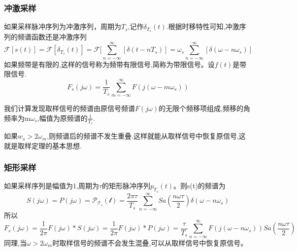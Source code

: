 \subsubsection{冲激采样}
\qquad 如果采样脉冲序列为冲激序列，周期为$T_s$,记作$\delta_{T_s}(t)$.根据时移特性可知,冲激序列的频谱函数还是冲激序列
\[
\mathcal{F}[{s(t)}]=\mathcal{F}[{\delta_{T_s}(t)}]=\mathcal{F}[\sum_{n=-\infty}^{\infty}[\delta(t-nT_s)]=\omega_s\sum_{n=-\infty}^{\infty}[\delta(\omega-n\omega_s)]
\]
\qquad 如果频带是有限的,这样的信号称为频带有限信号,简称为带限信号。设$f(t)$是带限信号.
\[
F_s(j\omega)=\frac{1}{T_s}\sum_{m=-\infty}^{\infty}F(j(\omega-m\omega_s))
\]
\par
我们计算发现取样信号的频谱由原信号频谱$F(j\omega)$的无限个频移项组成,频移的角频率为m$\omega_s$,幅值为原频谱的$\frac{1}{T_s}$.\par
 如果$w_s>2\omega_m$,则频谱后的频谱不发生重叠.这样就能从取样信号中恢复原信号,这就是取样定理的基本思想.\\
\subsubsection{矩形采样}
\qquad 如果采样序列是幅值为1,周期为$\tau$的矩形脉冲序列$p_{T_s}(t)$。则s(t)的频谱为
\[
    S(j\omega)=P(j\omega)=\mathcal{P_{T_s}(t)}=\frac{2\pi\tau}{T_s}\sum_{n=-\infty}^{\infty}Sa(\frac{n\omega\tau}{2})\delta(\omega-n\omega_s)
\]
所以
\[
    F_s(j\omega)=\frac{1}{2\pi}F(j\omega)*S(j\omega)=\frac{1}{2\pi}F(j\omega)*P(j\omega)
    =\frac{\tau}{T_s}\sum_{n=-\infty}^{\infty}F(j(\omega-n\omega_s))Sa(\frac{n\omega\tau}{2})
\]
同理,当$\omega>2\omega_m$时取样信号的频谱不会发生混叠,可以从取样信号中恢复原信号。
 